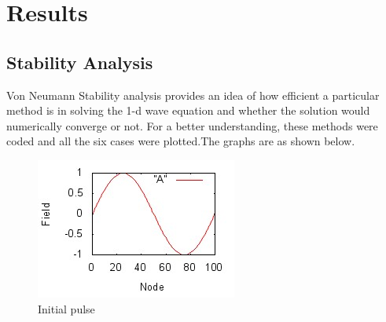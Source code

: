 \documentclass[a4paper,12pt]{report}
\begin{document}
\chapter{Results}
\section{Stability Analysis}
Von Neumann Stability analysis provides an idea of how efficient a particular method is in solving the 1-d wave equation and whether the solution would numerically converge or not. For a better understanding, these methods were coded and all the six cases were plotted.The graphs are as shown below.
\begin{figure} [h]
	\centering
	\includegraphics{Actual.jpeg}  
	\caption{Initial pulse} 
	\label{fig:initial} 
\end{figure} 
\end{document}
